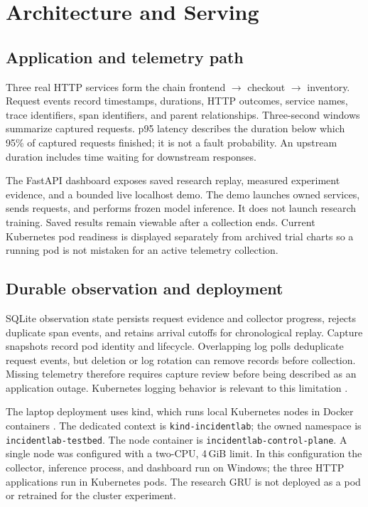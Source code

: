 \documentclass[conference]{IEEEtran}
\begin{document}
\section{Architecture and Serving}
\subsection{Application and telemetry path}
Three real HTTP services form the chain frontend $\rightarrow$ checkout $\rightarrow$ inventory. Request events record timestamps, durations, HTTP outcomes, service names, trace identifiers, span identifiers, and parent relationships. Three-second windows summarize captured requests. p95 latency describes the duration below which 95\% of captured requests finished; it is not a fault probability. An upstream duration includes time waiting for downstream responses.

The FastAPI dashboard exposes saved research replay, measured experiment evidence, and a bounded live localhost demo. The demo launches owned services, sends requests, and performs frozen model inference. It does not launch research training. Saved results remain viewable after a collection ends. Current Kubernetes pod readiness is displayed separately from archived trial charts so a running pod is not mistaken for an active telemetry collection.

\subsection{Durable observation and deployment}
SQLite observation state persists request evidence and collector progress, rejects duplicate span events, and retains arrival cutoffs for chronological replay. Capture snapshots record pod identity and lifecycle. Overlapping log polls deduplicate request events, but deletion or log rotation can remove records before collection. Missing telemetry therefore requires capture review before being described as an application outage. Kubernetes logging behavior is relevant to this limitation \cite{logging}.

The laptop deployment uses kind, which runs local Kubernetes nodes in Docker containers \cite{kind}. The dedicated context is \texttt{kind-incidentlab}; the owned namespace is \texttt{incidentlab-testbed}. The node container is \texttt{incidentlab-control-plane}. A single node was configured with a two-CPU, 4\,GiB limit. In this configuration the collector, inference process, and dashboard run on Windows; the three HTTP applications run in Kubernetes pods. The research GRU is not deployed as a pod or retrained for the cluster experiment.
\end{document}
